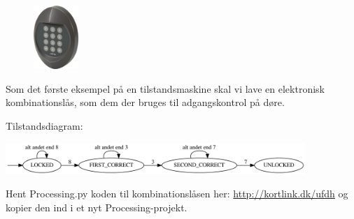 \documentclass{ucph-handout}
\newcounter{handout}
\newcommand{\Ark}{Ark \#\arabic{handout} -- }
\renewcommand{\Title}{\Ark Tegn med Processing.py}%
\begin{document}
\newpage
{}
\renewcommand{\Title}{\Ark Tilstandsmaskiner (Finite state machines)}
\begin{exercisebox}
\begin{minipage}{1.0\linewidth}
\begin{figure}
    \vspace{-1em}
    \includegraphics[width=0.15\textwidth]{../illustrations/images/unitek_kombinationslaas.jpg}
\end{figure}
  
Som det første eksempel på en tilstandsmaskine skal vi lave en
elektronisk kombinationslås, som dem der bruges til adgangskontrol på
døre.

\noindent
Tilstandsdiagram:

\noindent
\includegraphics[width=0.85\textwidth]{../illustrations/graphviz/combinationLock_dumb}

Hent Processing.py koden til kombinationslåsen her:
\mbox{\url{http://kortlink.dk/ufdh}} og kopier den ind i et nyt Processing-projekt.




\end{minipage}


\end{exercisebox}
\end{document}
